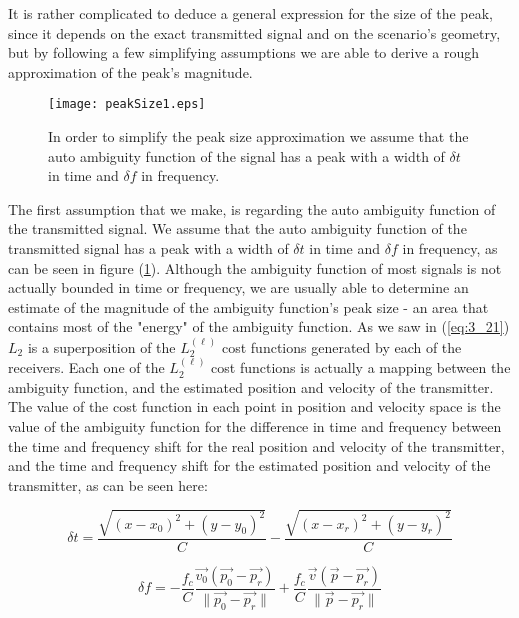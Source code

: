 It is rather complicated to deduce a general expression for the size of the peak, since it depends on the exact transmitted signal and on the scenario's geometry, but by following a few simplifying assumptions we are able to derive a rough approximation of the peak's magnitude.


\begin{figure}[h]
\begin{center}
\texttt{[image: peakSize1.eps]}
\end{center}
\caption[Auto ambiguity function assumption for the peak size approximation]
{In order to simplify the peak size approximation we assume that the auto ambiguity function of the signal has a peak with a width of $\delta t$ in time and $\delta f$ in frequency.}
\label{fig:peakSize1}
\end{figure}


The first assumption that we make, is regarding the auto ambiguity function of the transmitted signal. We assume that the auto ambiguity function of the transmitted signal has a peak with a width of $\delta t$ in time and $\delta f$ in frequency, as can be seen in figure (\ref{fig:peakSize1}). Although the ambiguity function of most signals is not actually bounded in time or frequency, we are usually able to determine an estimate of the magnitude of the ambiguity function's peak size - an area that contains most of the "energy" of the ambiguity function. As we saw in (\ref{eq:3_21}) $L_2$ is a superposition of the $L_2^{(\ell)}$ cost functions generated by each of the receivers. Each one of the $L_2^{(\ell)}$ cost functions is actually a mapping between the ambiguity function, and the estimated position and velocity of the transmitter. The value of the cost function in each point in position and velocity space is the value of the ambiguity function for the difference in time and frequency between the time and frequency shift for the real position and velocity of the transmitter, and the time and frequency shift for the estimated position and velocity of the transmitter, as can be seen here:

\begin{equation}
\label{eq:delta_t_def}
\delta t = \frac{\sqrt{(x-x_0)^2+(y-y_0)^2}}{C}-\frac{\sqrt{(x-x_r)^2+(y-y_r)^2}}{C}
\end{equation}

\begin{equation}
\label{eq:delta_f_def}
\delta f = -\frac{f_c}{C} \frac{\vec{v_0} (\vec{p_0}-\vec{p_r})}{\|\vec{p_0}-\vec{p_r}\|}+
\frac{f_c}{C} \frac{\vec{v} (\vec{p}-\vec{p_r})}{\|\vec{p}-\vec{p_r}\|}
\end{equation}


